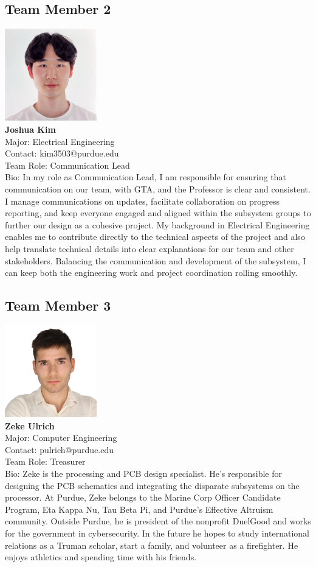 \subsection{Team Member 2}
\includegraphics[height=4cm]{images/joshua.png} \\
\textbf{Joshua Kim}\\
Major: Electrical Engineering\\
Contact: kim3503@purdue.edu\\
Team Role: Communication Lead \\
Bio: In my role as Communication Lead,
I am responsible for ensuring that communication on our
team, with GTA, and the Professor is clear and consistent.
I manage communications on updates, facilitate collaboration on
progress reporting, and keep everyone engaged and aligned within
the subsystem groups to further our design as a cohesive project.
My background in Electrical Engineering enables me to contribute
directly to the technical aspects of the project and also help
translate technical details into clear explanations for our team
and other stakeholders. Balancing the communication and development
of the subsystem, I can keep both the engineering work and project
coordination rolling smoothly.

\subsection{Team Member 3}
\includegraphics[height=4cm]{images/zeke.png} \\
\textbf{Zeke Ulrich}\\
Major: Computer Engineering\\
Contact: pulrich@purdue.edu\\
Team Role: Treasurer \\
Bio: Zeke is the processing and PCB design specialist.
He's responsible for designing the PCB schematics and
integrating the disparate subsystems on the processor.
At Purdue, Zeke belongs to the Marine Corp Officer Candidate Program,
Eta Kappa Nu, Tau Beta Pi, and Purdue's Effective Altruism community.
Outside Purdue, he is president of the nonprofit DuelGood and works
for the government in cybersecurity.
In the future he hopes to study international relations as a Truman
scholar, start a family, and volunteer as a firefighter.
He enjoys athletics and spending time with his friends.

